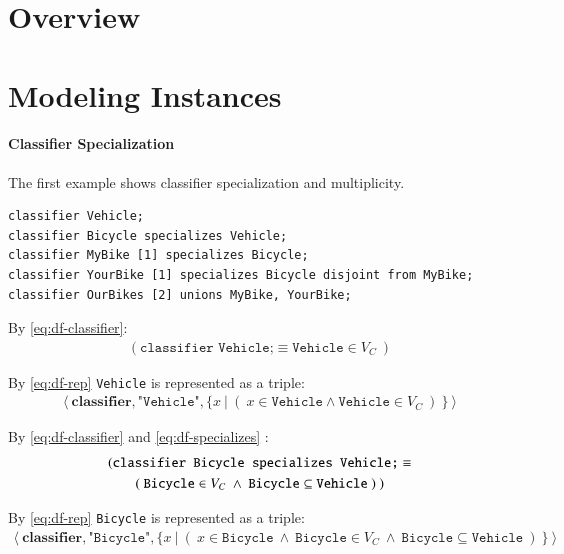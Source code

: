 
\section{Overview}


\section{Modeling Instances}
\paragraph{Classifier Specialization}

The first example shows classifier specialization and multiplicity.

\begin{lstlisting}
classifier Vehicle;
classifier Bicycle specializes Vehicle;
classifier MyBike [1] specializes Bicycle;
classifier YourBike [1] specializes Bicycle disjoint from MyBike;
classifier OurBikes [2] unions MyBike, YourBike;
\end{lstlisting}

By \ref{eq:df-classifier}:
\begin{gather}
 (\texttt{classifier Vehicle;} \equiv \texttt{Vehicle}\in V_C~)
\end{gather}
 
By \ref{eq:df-rep} \texttt{Vehicle} is represented as a triple:
\begin{gather}
\langle~\textbf{classifier},\texttt{"Vehicle"},\{x~\vert ~(~ x \in \texttt{Vehicle} \wedge \texttt{Vehicle}\in V_C~)~\}~\rangle
\label{eq:vehicle}
\end{gather}
 
By \ref{eq:df-classifier} and \ref{eq:df-specializes} :
 \begin{gather}
 (\texttt{classifier Bicycle specializes Vehicle;} \equiv \notag \\
  (~\texttt{Bicycle}\in V_C~\wedge~ \texttt{Bicycle}\subseteq\texttt{Vehicle}~)~)
\end{gather}
 
By \ref{eq:df-rep} \texttt{Bicycle} is represented as a triple:
\begin{gather}
\langle~\textbf{classifier},\texttt{"Bicycle"},\{x~\vert ~(~ x \in \texttt{Bicycle} ~\wedge~ \texttt{Bicycle}\in V_C~\wedge~ \texttt{Bicycle}\subseteq\texttt{Vehicle}~)~\}~\rangle
\label{eq:bicycle}
\end{gather}

